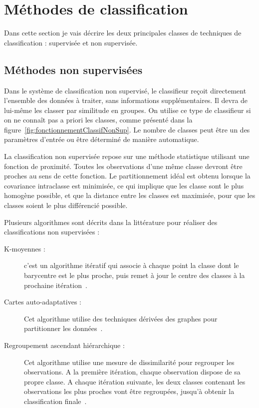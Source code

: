 	\section{Méthodes de classification}

Dans cette section je vais décrire les deux principales classes de techniques de classification : supervisée et non supervisée.

		\subsection{Méthodes non supervisées}

 Dans le système de classification non supervisé, le classifieur reçoit directement l'ensemble des données à traiter, sans informations supplémentaires. Il devra de lui-même les classer par similitude en groupes. On utilise ce type de classifieur si on ne connaît pas a priori les classes, comme présenté dans la figure~\ref{fig:fonctionnementClassifNonSup}. Le nombre de classes peut être un des paramètres d'entrée ou être déterminé de manière automatique.

La classification non supervisée repose sur une méthode statistique utilisant une fonction de proximité. Toutes les observations d'une même classe devront être proches au sens de cette fonction. Le partitionnement idéal est obtenu lorsque la covariance intraclasse est minimisée, ce qui implique que les classe sont le plus homogène possible, et que la distance entre les classes est maximisée, pour que les classes soient le plus différencié possible.

Plusieurs algorithmes sont décrits dans la littérature pour réaliser des classifications non supervisées :

\begin{description}
 \item[K-moyennes : ] c'est un algorithme itératif qui associe à chaque point la classe dont le barycentre est le plus proche, puis remet à jour le centre des classes à la prochaine itération~\cite{herwig1999large}.
 \item[Cartes auto-adaptatives : ] Cet algorithme utilise des techniques dérivées des graphes pour partitionner les données~\cite{kohonen1982self}.
 \item[Regroupement ascendant hiérarchique : ] Cet algorithme utilise une mesure de dissimilarité pour regrouper les observations. A la première itération, chaque observation dispose de sa propre classe. A chaque itération suivante, les deux classes contenant les observations les plus proches vont être regroupées, jusqu'à obtenir la classification finale~\cite{ward1963hierarchical}.
\end{description}


